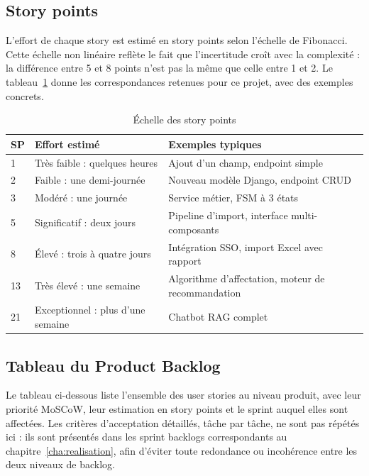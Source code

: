 \subsection{Story points}

L'effort de chaque story est estimé en story points selon l'échelle de Fibonacci. Cette échelle non linéaire reflète le fait que l'incertitude croît avec la complexité : la différence entre 5 et 8 points n'est pas la même que celle entre 1 et 2. Le tableau~\ref{tab:story-points} donne les correspondances retenues pour ce projet, avec des exemples concrets.

\begin{table}[H]
\centering
\caption{Échelle des story points}
\label{tab:story-points}
\footnotesize
\renewcommand{\arraystretch}{1.4}
\begin{tabular}{|p{1cm}|p{6cm}|p{8.5cm}|}
\hline
\rowcolor{gray!20}
\textbf{SP} & \textbf{Effort estimé} & \textbf{Exemples typiques} \\
\hline
1 & Très faible : quelques heures & Ajout d'un champ, endpoint simple \\
\hline
2 & Faible : une demi-journée & Nouveau modèle Django, endpoint CRUD \\
\hline
3 & Modéré : une journée & Service métier, FSM à 3 états \\
\hline
5 & Significatif : deux jours & Pipeline d'import, interface multi-composants \\
\hline
8 & Élevé : trois à quatre jours & Intégration SSO, import Excel avec rapport \\
\hline
13 & Très élevé : une semaine & Algorithme d'affectation, moteur de recommandation \\
\hline
21 & Exceptionnel : plus d'une semaine & Chatbot RAG complet \\
\hline
\end{tabular}
\end{table}

\subsection{Tableau du Product Backlog}

Le tableau ci-dessous liste l'ensemble des user stories au niveau produit, avec leur priorité MoSCoW, leur estimation en story points et le sprint auquel elles sont affectées. Les critères d'acceptation détaillés, tâche par tâche, ne sont pas répétés ici : ils sont présentés dans les sprint backlogs correspondants au chapitre~\ref{cha:realisation}, afin d'éviter toute redondance ou incohérence entre les deux niveaux de backlog.


